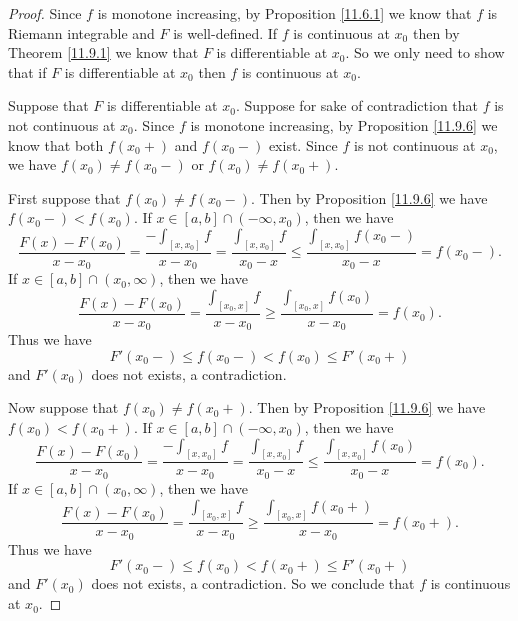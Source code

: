 \begin{proof}
    Since \(f\) is monotone increasing, by Proposition \ref{11.6.1} we know that \(f\) is Riemann integrable and \(F\) is well-defined.
    If \(f\) is continuous at \(x_0\) then by Theorem \ref{11.9.1} we know that \(F\) is differentiable at \(x_0\).
    So we only need to show that if \(F\) is differentiable at \(x_0\) then \(f\) is continuous at \(x_0\).

    Suppose that \(F\) is differentiable at \(x_0\).
    Suppose for sake of contradiction that \(f\) is not continuous at \(x_0\).
    Since \(f\) is monotone increasing, by Proposition \ref{11.9.6} we know that both \(f(x_0+)\) and \(f(x_0-)\) exist.
    Since \(f\) is not continuous at \(x_0\), we have \(f(x_0) \neq f(x_0-)\) or \(f(x_0) \neq f(x_0+)\).

    First suppose that \(f(x_0) \neq f(x_0-)\).
    Then by Proposition \ref{11.9.6} we have \(f(x_0-) < f(x_0)\).
    If \(x \in [a, b] \cap (-\infty, x_0)\), then we have
    \[
        \frac{F(x) - F(x_0)}{x - x_0} = \frac{-\int_{[x, x_0]} f}{x - x_0} = \frac{\int_{[x, x_0]} f}{x_0 - x} \leq \frac{\int_{[x, x_0]} f(x_0-)}{x_0 - x} = f(x_0-).
    \]
    If \(x \in [a, b] \cap (x_0, \infty)\), then we have
    \[
        \frac{F(x) - F(x_0)}{x - x_0} = \frac{\int_{[x_0, x]} f}{x - x_0} \geq \frac{\int_{[x_0, x]} f(x_0)}{x - x_0} = f(x_0).
    \]
    Thus we have
    \[
        F'(x_0-) \leq f(x_0-) < f(x_0) \leq F'(x_0+)
    \]
    and \(F'(x_0)\) does not exists, a contradiction.

    Now suppose that \(f(x_0) \neq f(x_0+)\).
    Then by Proposition \ref{11.9.6} we have \(f(x_0) < f(x_0+)\).
    If \(x \in [a, b] \cap (-\infty, x_0)\), then we have
    \[
        \frac{F(x) - F(x_0)}{x - x_0} = \frac{-\int_{[x, x_0]} f}{x - x_0} = \frac{\int_{[x, x_0]} f}{x_0 - x} \leq \frac{\int_{[x, x_0]} f(x_0)}{x_0 - x} = f(x_0).
    \]
    If \(x \in [a, b] \cap (x_0, \infty)\), then we have
    \[
        \frac{F(x) - F(x_0)}{x - x_0} = \frac{\int_{[x_0, x]} f}{x - x_0} \geq \frac{\int_{[x_0, x]} f(x_0+)}{x - x_0} = f(x_0+).
    \]
    Thus we have
    \[
        F'(x_0-) \leq f(x_0) < f(x_0+) \leq F'(x_0+)
    \]
    and \(F'(x_0)\) does not exists, a contradiction.
    So we conclude that \(f\) is continuous at \(x_0\).
\end{proof}